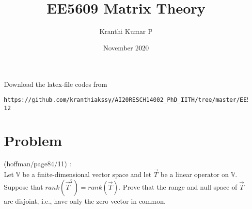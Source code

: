 \documentclass[journal,12pt]{IEEEtran}
\begin{document}
     \def\rightbox#1{\makebox[0in][r]{#1}}
     \def\centbox#1{\makebox[0in]{#1}}
     \def\topbox#1{\raisebox{-\baselineskip}[0in][0in]{#1}}
     \def\midbox#1{\raisebox{-0.5\baselineskip}[0in][0in]{#1}}
\vspace{3cm}
\title{EE5609 Matrix Theory}
\author{Kranthi Kumar P}
\date{November 2020}
\maketitle
\bigskip
\renewcommand{\thefigure}{\theenumi}
\renewcommand{\thetable}{\theenumi}

Download the latex-file codes from 
\begin{lstlisting}
https://github.com/kranthiakssy/AI20RESCH14002_PhD_IITH/tree/master/EE5609_Matrix_Theory/Assignment-12
\end{lstlisting}
\section{\textbf{Problem}}
(hoffman/page84/11) : \\
Let $\mathbb{V}$ be a finite-dimensional vector space and let $\vec{T}$ be a linear operator on $\mathbb{V}$. Suppose that $rank (\vec{T}^2) = rank (\vec{T})$. Prove that the range and null space  of $\vec{T}$ are disjoint, i.e., have only the zero vector in common.
\end{document}
